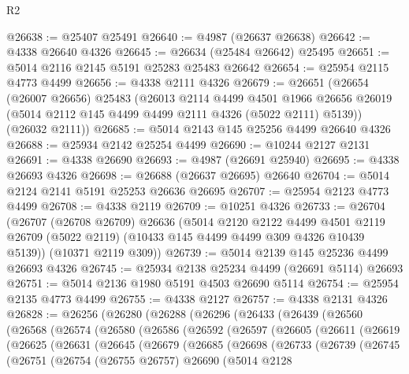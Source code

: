 \begin{lexlean}{R2}
\begin{coremodule}
@26638 := @25407 @25491
@26640 := @4987 (@26637 @26638)
@26642 := @4338 @26640 @4326
@26645 := @26634 (@25484 @26642) @25495
@26651 := @5014 @2116 @2145 @5191 @25283 @25483 @26642
@26654 := @25954 @2115 @4773 @4499
@26656 := @4338 @2111 @4326
@26679 := @26651
    (@26654
      (@26007 @26656)
      @25483
      (@26013
        @2114
        @4499
        @4501
        @1966
        @26656
        @26019
        (@5014 @2112 @145 @4499 @4499 @2111 @4326 (@5022 @2111) @5139))
      (@26032 @2111))
@26685 := @5014 @2143 @145 @25256 @4499 @26640 @4326
@26688 := @25934 @2142 @25254 @4499
@26690 := @10244 @2127 @2131
@26691 := @4338 @26690
@26693 := @4987 (@26691 @25940)
@26695 := @4338 @26693 @4326
@26698 := @26688 (@26637 @26695) @26640
@26704 := @5014 @2124 @2141 @5191 @25253 @26636 @26695
@26707 := @25954 @2123 @4773 @4499
@26708 := @4338 @2119
@26709 := @10251 @4326
@26733 := @26704
    (@26707
      (@26708 @26709)
      @26636
      (@5014
        @2120
        @2122
        @4499
        @4501
        @2119
        @26709
        (@5022 @2119)
        (@10433 @145 @4499 @4499 @309 @4326 @10439 @5139))
      (@10371 @2119 @309))
@26739 := @5014 @2139 @145 @25236 @4499 @26693 @4326
@26745 := @25934 @2138 @25234 @4499 (@26691 @5114) @26693
@26751 := @5014 @2136 @1980 @5191 @4503 @26690 @5114
@26754 := @25954 @2135 @4773 @4499
@26755 := @4338 @2127
@26757 := @4338 @2131 @4326
@26828 := @26256
    (@26280
      (@26288
        (@26296
          (@26433
            (@26439
              (@26560
                (@26568
                  (@26574
                    (@26580
                      (@26586
                        (@26592
                          (@26597
                            (@26605
                              (@26611
                                (@26619
                                  (@26625
                                    (@26631
                                      (@26645
                                        (@26679
                                          (@26685
                                            (@26698
                                              (@26733
                                                (@26739
                                                  (@26745
                                                    (@26751
                                                      (@26754
                                                        (@26755 @26757)
                                                        @26690
                                                        (@5014
                                                          @2128

\end{coremodule}
\end{lexlean}
